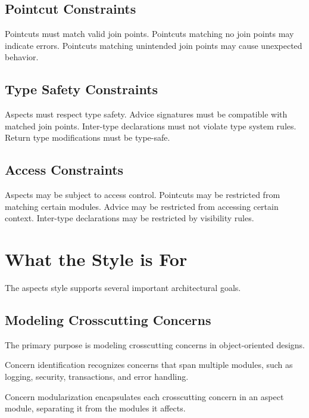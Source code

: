 \documentclass[11pt]{article}
\begin{document}
\subsection{Pointcut Constraints}

Pointcuts must match valid join points. Pointcuts matching no join points may indicate errors. Pointcuts matching unintended join points may cause unexpected behavior.

\subsection{Type Safety Constraints}

Aspects must respect type safety. Advice signatures must be compatible with matched join points. Inter-type declarations must not violate type system rules. Return type modifications must be type-safe.

\subsection{Access Constraints}

Aspects may be subject to access control. Pointcuts may be restricted from matching certain modules. Advice may be restricted from accessing certain context. Inter-type declarations may be restricted by visibility rules.

\section{What the Style is For}

The aspects style supports several important architectural goals.

\subsection{Modeling Crosscutting Concerns}

The primary purpose is modeling crosscutting concerns in object-oriented designs.

Concern identification recognizes concerns that span multiple modules, such as logging, security, transactions, and error handling.

Concern modularization encapsulates each crosscutting concern in an aspect module, separating it from the modules it affects.
\end{document}

